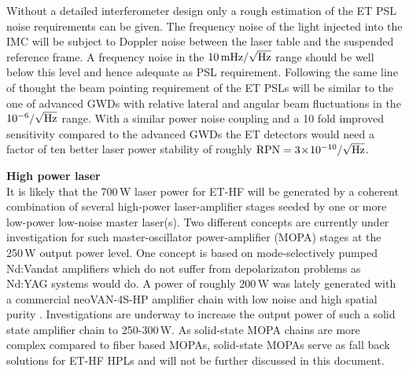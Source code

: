 Without a detailed interferometer design only a rough estimation of the ET PSL
noise requirements can be given. The frequency noise of the light injected into
the IMC will be subject to Doppler noise between the laser table and the
suspended reference frame. A frequency noise in the $10\,\rm{mHz} /
\sqrt{\rm{Hz}}$ range should be well below this level and hence adequate as PSL
requirement. Following the same line of thought the beam pointing requirement of
the ET PSLs will be similar to the one of advanced GWDs with relative lateral
and angular beam fluctuations in the $10^{-6} / \sqrt{\rm{Hz}}$
range\cite{Kwee2012}. With a similar power noise coupling and a 10 fold improved
sensitivity compared to the advanced GWDs the ET detectors would need a factor
of ten better laser power stability of roughly $\rm{RPN} = 3\!\times\!10^{-10} /
\sqrt{\rm{Hz}}$. 


{\bf High power laser}\\
 It is likely that the 700\,W laser power for ET-HF will be generated by a
 coherent combination of several high-power laser-amplifier stages seeded by one
 or more low-power low-noise master laser(s). Two different concepts are
 currently under investigation for such master-oscillator power-amplifier (MOPA)
 stages at the 250\,W output power level. One concept is based on
 mode-selectively pumped Nd:Vandat amplifiers which do not suffer from
 depolarizaton problems as Nd:YAG systems would do. A power of roughly 200\,W
 was lately generated with a commercial neoVAN-4S-HP amplifier chain with low
 noise and high spatial purity \cite{Bode2020, Willke2019}. Investigations are
 underway to increase the output power of such a solid state amplifier chain to
 250-300\,W. As solid-state MOPA chains are more complex compared to fiber based
 MOPAs, solid-state MOPAs serve as fall back solutions for ET-HF HPLs and will
 not be further discussed in this document.
 
